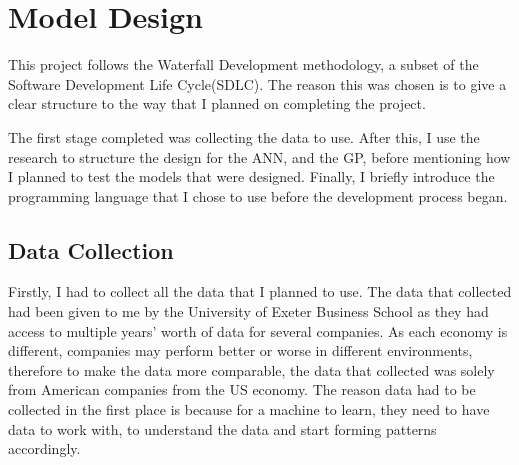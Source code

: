 \documentclass[11pt]{article}
\begin{document}
\section{Model Design}\label{sec:design}
This project follows the Waterfall Development methodology, a subset of the Software Development Life Cycle(SDLC). The reason this was chosen is to give a clear structure to the way that I planned on completing the project. 

The first stage completed was collecting the data to use. After this, I use the research to structure the design for the ANN, and the GP, before mentioning how I planned to test the models that were designed. Finally, I briefly introduce the programming language that I chose to use before the development process began.
\subsection{Data Collection}\label{subsec:dataColl}
Firstly, I had to collect all the data that I planned to use. The data that collected had been given to me by the University of Exeter Business School as they had access to multiple years' worth of data for several companies. As each economy is different, companies may perform better or worse in different environments, therefore to make the data more comparable, the data that collected was solely from American companies from the US economy. The reason data had to be collected in the first place is because for a machine to learn, they need to have data to work with, to understand the data and start forming patterns accordingly. 
\end{document}
